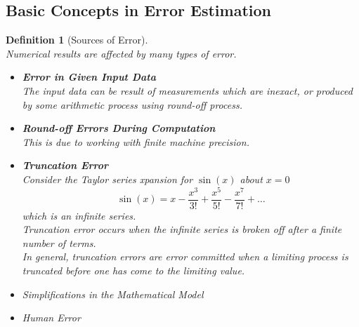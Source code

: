 \documentclass[12pt]{article}
\newtheorem{definition}{Definition}[section]
\theoremstyle{definition}
\begin{document}
\subsection{Basic Concepts in Error Estimation}
\begin{definition}[Sources of Error]
\hfill\\\normalfont Numerical results are affected by many types of error.
\begin{itemize}
  \item \textbf{Error in Given Input Data}\\The input data can be \textit{result of measurements} which are inexact, or produced by some \textit{arithmetic process using round-off process}.
  \item \textbf{Round-off Errors During Computation}\\This is due to working with \textit{finite machine precision}.
  \item \textbf{Truncation Error}\\Consider the Taylor series xpansion for $\sin(x)$ about $x=0$
  \[
\sin(x) = x-\frac{x^3}{3!}+\frac{x^5}{5!}-\frac{x^7}{7!}+\ldots
  \]
which is an infinite series.\\Truncation error occurs when the \textit{infinite series is broken off after a finite number of terms}.\\In general, truncation errors are error committed when \textit{a limiting process is truncated before one has come to the limiting value}.
  \item Simplifications in the Mathematical Model
  \item Human Error
\end{itemize}
\end{definition}
\end{document}
